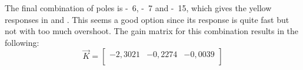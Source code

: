 The final combination of poles is \si{-6}, \si{-7} and \si{-15}, which gives the yellow responses in  and . This seems a good option since its response is quite fast but not with too much overshoot. The gain matrix for this combination results in the following:
%
\begin{equation}  \label{controllerSS}
	\vec{K} = 
	\begin{bmatrix}
		-2,3021 & -0,2274 & -0,0039 \\
	\end{bmatrix}
\end{equation}
%